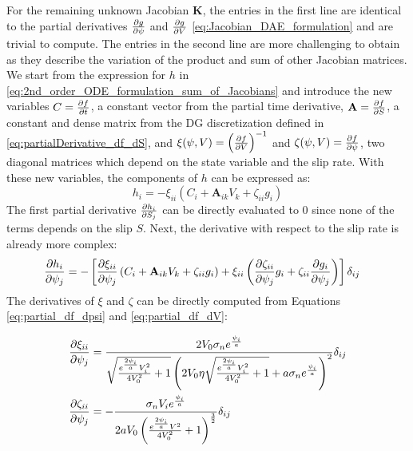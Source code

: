 For the remaining unknown Jacobian $\mathbf{K}$, the entries in the first line are identical to the partial derivatives $\pdv{g}{\psi}$ and $\pdv{g}{V}$ \autoref{eq:Jacobian_DAE_formulation} and are trivial to compute. The entries in the second line are more challenging to obtain as they describe the variation of the product and sum of other Jacobian matrices. \\

We start from the expression for $h$ in \autoref{eq:2nd_order_ODE_formulation_sum_of_Jacobians} and introduce the new variables $C = \pdv{f}{t}$, a constant vector from the partial time derivative, $\mathbf{A} = \pdv{f}{S}$, a constant and dense matrix from the DG discretization defined in \autoref{eq:partialDerivative_df_dS}, and $\xi(\psi,V) = \left(\pdv{f}{V}\right)^{-1}$ and $\zeta(\psi,V) = \pdv{f}{\psi}$, two diagonal matrices which depend on the state variable and the slip rate. With these new variables, the components of $h$ can be expressed as:
\begin{equation}
	h_i = -\xi_{ii}\left(C_i + \mathbf{A}_{ik}V_k + \zeta_{ii}g_i\right)
\end{equation}
The first partial derivative $\pdv{h_i}{S_j}$ can be directly evaluated to 0 since none of the terms depends on the slip $S$. Next, the derivative with respect to the slip rate is already more complex:
\begin{align}
	\pdv{h_i}{\psi_j} &= -\left[\pdv{\xi_{ii}}{\psi_j}\left(C_i + \mathbf{A}_{ik}V_k + \zeta_{ii}g_i\right) + \xi_{ii}\left(\pdv{\zeta_{ii}}{\psi_j}g_i + \zeta_{ii}\pdv{g_i}{\psi_j}\right)\right]\delta_{ij}
\end{align}
The derivatives of $\xi$ and $\zeta$ can be directly computed from Equations \ref{eq:partial_df_dpsi} and \ref{eq:partial_df_dV}:

\begin{align}
	\pdv{\xi_{ii}}{\psi_j} &= \frac{2V_0\sigma_n e^{\frac{\psi_i}{a}}}{\sqrt{\frac{e^{\frac{2\psi_i}{a}}V_i^2}{4V_0^2}+1}\left(2V_0\eta\sqrt{\frac{e^{\frac{2\psi_i}{a}}V_i^2}{4V_0^2}+1}+a\sigma_n e^{\frac{\psi_i}{a}}\right)^2}\delta_{ij} \\
	\pdv{\zeta_{ii}}{\psi_j} &= -\frac{\sigma_nV_ie^{\frac{\psi_i}{a}}}{2aV_0\left(\frac{e^{\frac{2\psi_i}{a}}V^2}{4V_0^2}+1\right)^{\frac{3}{2}}}\delta_{ij}
\end{align}


